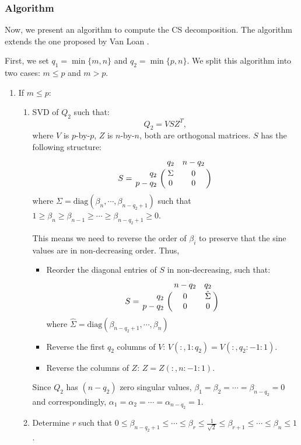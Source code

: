 \subsubsection{Algorithm} 
Now, we present an algorithm to compute the CS decomposition. 
The algorithm extends the one proposed by Van Loan \cite{vanloan85}.    
    
First, we set $q_1 = \min\{m, n\}$ and $q_2 = \min\{p, n\}$. 
We split this algorithm into two cases: $m \leq p$ and $m > p$.
    
\begin{enumerate}
\item If $m \leq p$:
\begin{enumerate}
\item SVD of $Q_2$ such that:
\begin{equation}
Q_2 = VSZ^{T}, 
\end{equation}
where $V$ is $p$-by-$p$, $Z$ is $n$-by-$n$, both are orthogonal matrices. 
$S$ has the following structure:
\begin{displaymath}
S = \bordermatrix{ & q_2 & n-q_2 \cr
\hfill q_2 & \Sigma & 0 \cr
\hfill p-q_2 & 0 & 0}
\end{displaymath}
where $\Sigma = \mbox{diag}(\beta_n, \cdots, \beta_{n-q_2+1})$ 
such that 
$1 \geq \beta_n \geq \beta_{n-1} \geq \cdots \geq \beta_{n-q_2+1} \geq 0$. 

This means we need to reverse the order of $\beta_{i}$ to preserve that the sine values are in non-decreasing order. Thus,
\begin{itemize}
\item Reorder the diagonal entries of $S$ in non-decreasing, such that:
\begin{displaymath}
S = \bordermatrix{ & n-q_2 & q_2 \cr
\hfill q_2 & 0 & \hat{\Sigma} \cr
\hfill p-q_2 & 0 & 0}
\end{displaymath} 
where $\hat{\Sigma} = \mbox{diag}(\beta_{n-q_2+1}, \cdots, \beta_{n})$
\item Reverse the first $q_2$ columns of $V$: $V(:,1:q_2) = V(:,q_2:-1:1)$. 
\item Reverse the columns of $Z$: $Z = Z(:,n:-1:1)$. 
\end{itemize}
                    
Since $Q_2$ has $(n-q_2)$ zero singular values, 
$\beta_{1} = \beta_{2} = \cdots = \beta_{n-q_2} = 0$ and 
correspondingly, $\alpha_1 = \alpha_2 = \cdots = \alpha_{n-q_2} = 1$.

\item Determine $r$ such that 
$0 \leq \beta_{n-q_2+1} \leq \cdots \leq \beta_{r} 
\leq \frac{1}{\sqrt{2}} \leq \beta_{r+1} \leq \cdots \leq \beta_{n} \leq 1$. 
                

\end{enumerate}
\end{enumerate}
